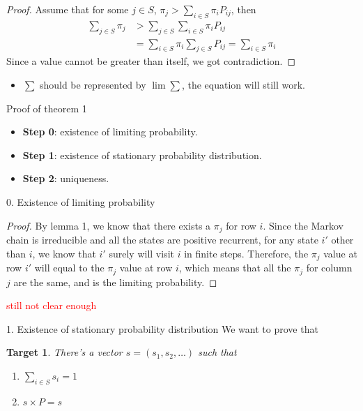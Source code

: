 \documentclass[mathserif]{beamer}
\newtheorem{target}{Target}
\begin{document}
\begin{frame}
	\begin{proof}
		Assume that for some $j \in S$,
		$\pi_j > \sum_{i \in S} \pi_i P_{ij}$, then
		\begin{align*}
			\sum_{j \in S} \pi_j &> \sum_{j \in S}\sum_{i \in S} \pi_i P_{ij} \\
			&= \sum_{i \in S} \pi_i \sum_{j \in S} P_{ij} = \sum_{i \in S} \pi_i
		\end{align*}
		Since a value cannot be greater than itself, we got contradiction.
	\end{proof}
	\begin{itemize}
		\item $\sum$ should be represented by $\lim \sum$, the equation will still work.
	\end{itemize}
\end{frame}

\begin{frame}{Proof of theorem 1}\label{thm1_proof}
	\begin{itemize}
		\item \textbf{Step 0}: existence of limiting probability.
		\item \textbf{Step 1}: existence of stationary probability distribution.
		\item \textbf{Step 2}: uniqueness.
	\end{itemize}
\end{frame}

\begin{frame}{0. Existence of limiting probability}
	\begin{proof}
		By lemma 1, we know that there exists a $\pi_j$ for row $i$.
		Since the Markov chain is irreducible and all the states are positive recurrent, 
		for any state $i'$ other than $i$, we know that $i'$ surely will visit $i$ in finite steps.
		Therefore, the $\pi_j$ value at row $i'$ will equal to the $\pi_j$ value at row $i$,
		which means that all the $\pi_j$ for column $j$ are the same, and is the limiting probability.
	\end{proof}
	\textcolor{red}{still not clear enough}
\end{frame}

\begin{frame}{1. Existence of stationary probability distribution}
	We want to prove that
	\begin{target}
		There's a vector $s = (s_1, s_2, \ldots)$ such that
		\begin{enumerate}
			\item $\sum_{i \in S} s_i = 1$
			\item $s \times P = s$
		\end{enumerate}
	\end{target}
\end{frame}
\end{document}
